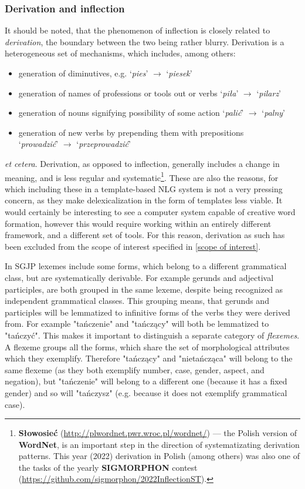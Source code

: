 \documentclass[12pt]{article}
\newcommand{\inlinegloss}[1]{`\textit{#1}'}
\begin{document}
\subsubsection{Derivation and inflection}
\label{derivation}
It should be noted, that the phenomenon of inflection is closely related to \textit{derivation}, the boundary between the two being rather blurry. Derivation is a heterogeneous set of mechanisms, which includes, among others: \begin{itemize}
	\item generation of diminutives, e.g. \inlinegloss{pies} $\rightarrow$ \inlinegloss{piesek}
	\item generation of names of professions or tools out or verbs \inlinegloss{piła} $\rightarrow$ \inlinegloss{pilarz}
	\item generation of nouns signifying possibility of some action \inlinegloss{palić} $\rightarrow$ \inlinegloss{palny}
	\item generation of new verbs by prepending them with prepositions \\ \inlinegloss{prowadzić} $\rightarrow$ \inlinegloss{przeprowadzić}
\end{itemize}
\textit{et cetera}. Derivation, as opposed to inflection, generally includes a change in meaning, and is less regular and systematic\footnote{\textbf{Słowosieć} (\url{http://plwordnet.pwr.wroc.pl/wordnet/}) --- the Polish version of \textbf{WordNet}, is an important step in the direction of systematizating derivation patterns. This year (2022) derivation in Polish (among others) was also one of the tasks of the yearly \textbf{SIGMORPHON} contest (\url{https://github.com/sigmorphon/2022InflectionST}).}. These are also the reasons, for which including these in a template-based NLG system is not a very pressing concern, as they make delexicalization in the form of templates less viable. It would certainly be interesting to see a computer system capable of creative word formation, however this would require working within an entirely different framework, and a different set of tools. For this reason, derivation as such has been excluded from the scope of interest specified in \autoref{scope of interest}.

In SGJP lexemes include some forms, which belong to a different grammatical class, but are systematically derivable. For example gerunds and adjectival participles, are both grouped in the same lexeme, despite being recognized as independent grammatical classes. This grouping means, that gerunds and participles will be lemmatized to infinitive forms of the verbs they were derived from. For example "tańczenie" and "tańczący" will both be lemmatized to "tańczyć". This makes it important to distinguish a separate category of \textit{flexemes}. A flexeme groups all the forms, which share the set of morphological attributes which they exemplify. Therefore "tańczący" and "nietańcząca" will belong to the same flexeme (as they both exemplify number, case, gender, aspect, and negation), but "tańczenie" will belong to a different one (because it has a fixed gender) and so will "tańczysz" (e.g. because it does not exemplify grammatical case).
\end{document}
